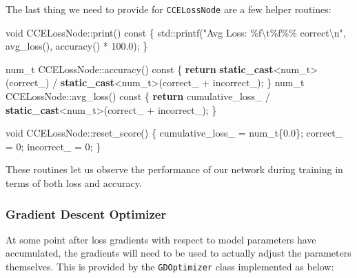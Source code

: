 \documentclass[
]{article}
\newenvironment{Shaded}{}{}
\newcommand{\AttributeTok}[1]{\textcolor[rgb]{0.49,0.56,0.16}{#1}}
\newcommand{\BuiltInTok}[1]{#1}
\newcommand{\ControlFlowTok}[1]{\textcolor[rgb]{0.00,0.44,0.13}{\textbf{#1}}}
\newcommand{\DataTypeTok}[1]{\textcolor[rgb]{0.56,0.13,0.00}{#1}}
\newcommand{\DecValTok}[1]{\textcolor[rgb]{0.25,0.63,0.44}{#1}}
\newcommand{\FloatTok}[1]{\textcolor[rgb]{0.25,0.63,0.44}{#1}}
\newcommand{\KeywordTok}[1]{\textcolor[rgb]{0.00,0.44,0.13}{\textbf{#1}}}
\newcommand{\NormalTok}[1]{#1}
\newcommand{\SpecialCharTok}[1]{\textcolor[rgb]{0.25,0.44,0.63}{#1}}
\newcommand{\StringTok}[1]{\textcolor[rgb]{0.25,0.44,0.63}{#1}}
\newcommand{\VariableTok}[1]{\textcolor[rgb]{0.10,0.09,0.49}{#1}}
\begin{document}
The last thing we need to provide for \texttt{CCELossNode} are a few
helper routines:

\begin{Shaded}
\begin{Highlighting}[]
\DataTypeTok{void}\NormalTok{ CCELossNode::print() }\AttributeTok{const}
\NormalTok{\{}
    \BuiltInTok{std::}\NormalTok{printf(}\StringTok{"Avg Loss: }\SpecialCharTok{\%f\textbackslash{}t\%f\%\%}\StringTok{ correct}\SpecialCharTok{\textbackslash{}n}\StringTok{"}\NormalTok{, avg\_loss(), accuracy() * }\FloatTok{100.0}\NormalTok{);}
\NormalTok{\}}

\DataTypeTok{num\_t}\NormalTok{ CCELossNode::accuracy() }\AttributeTok{const}
\NormalTok{\{}
    \ControlFlowTok{return} \KeywordTok{static\_cast}\NormalTok{\textless{}}\DataTypeTok{num\_t}\NormalTok{\textgreater{}(}\VariableTok{correct\_}\NormalTok{)}
\NormalTok{           / }\KeywordTok{static\_cast}\NormalTok{\textless{}}\DataTypeTok{num\_t}\NormalTok{\textgreater{}(}\VariableTok{correct\_}\NormalTok{ + }\VariableTok{incorrect\_}\NormalTok{);}
\NormalTok{\}}
\DataTypeTok{num\_t}\NormalTok{ CCELossNode::avg\_loss() }\AttributeTok{const}
\NormalTok{\{}
    \ControlFlowTok{return} \VariableTok{cumulative\_loss\_}\NormalTok{ / }\KeywordTok{static\_cast}\NormalTok{\textless{}}\DataTypeTok{num\_t}\NormalTok{\textgreater{}(}\VariableTok{correct\_}\NormalTok{ + }\VariableTok{incorrect\_}\NormalTok{);}
\NormalTok{\}}

\DataTypeTok{void}\NormalTok{ CCELossNode::reset\_score()}
\NormalTok{\{}
    \VariableTok{cumulative\_loss\_}\NormalTok{ = }\DataTypeTok{num\_t}\NormalTok{\{}\FloatTok{0.0}\NormalTok{\};}
    \VariableTok{correct\_}\NormalTok{         = }\DecValTok{0}\NormalTok{;}
    \VariableTok{incorrect\_}\NormalTok{       = }\DecValTok{0}\NormalTok{;}
\NormalTok{\}}
\end{Highlighting}
\end{Shaded}

These routines let us observe the performance of our network during
training in terms of both loss and accuracy.

\hypertarget{gradient-descent-optimizer}{%
\subsubsection{Gradient Descent
Optimizer}\label{gradient-descent-optimizer}}

At some point after loss gradients with respect to model parameters have
accumulated, the gradients will need to be used to actually adjust the
parameters themselves. This is provided by the \texttt{GDOptimizer}
class implemented as below:
\end{document}
